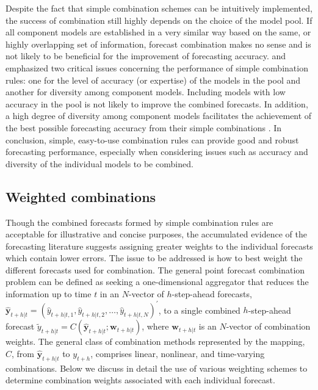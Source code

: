 \documentclass[11pt]{article}
\begin{document}
Despite the fact that simple combination schemes can be intuitively implemented, the success of combination still highly depends on the choice of the model pool. If all component models are established in a very similar way based on the same, or highly overlapping set of information, forecast combination makes no sense and is not likely to be beneficial for the improvement of forecasting accuracy. \cite{Mannes2014-dl} and \cite{Lichtendahl2020-ut} emphasized two critical issues concerning the performance of simple combination rules: one for the level of accuracy (or expertise) of the models in the pool and another for diversity among component models. Including models with low accuracy in the pool is not likely to improve the combined forecasts. In addition, a high degree of diversity among component models facilitates the achievement of the best possible forecasting accuracy from their simple combinations \citep{Thomson2019-al}. In conclusion, simple, easy-to-use combination rules can provide good and robust forecasting performance, especially when considering issues such as accuracy and diversity of the individual models to be combined.


\subsection{Weighted combinations}
\label{sec:weighted_combinations}

Though the combined forecasts formed by simple combination rules are acceptable for illustrative and concise purposes, the accumulated evidence of the forecasting literature suggests assigning greater weights to the individual forecasts which contain lower errors. The issue to be addressed is how to best weight the different forecasts used for combination. The general point forecast combination problem can be defined as seeking a one-dimensional aggregator that reduces the information up to time $t$ in an $N$-vector of $h$-step-ahead forecasts, $\hat{\mathbf{y}}_{t+h|t}=\left(\hat{y}_{t+h|t, 1}, \hat{y}_{t+h|t, 2}, \ldots, \hat{y}_{t+h|t, N}\right)^{\prime}$, to a single combined $h$-step-ahead forecast $\tilde{y}_{t+h|t}=C\left(\hat{\mathbf{y}}_{t+h|t} ; \boldsymbol{w}_{t+h|t}\right)$, where $\boldsymbol{w}_{t+h|t}$ is an $N$-vector of combination weights. The general class of combination methods represented by the mapping, $C$, from $\hat{\mathbf{y}}_{t+h|t}$ to $y_{t+h}$, comprises linear, nonlinear, and time-varying combinations. Below we discuss in detail the use of various weighting schemes to determine combination weights associated with each individual forecast.
\end{document}

